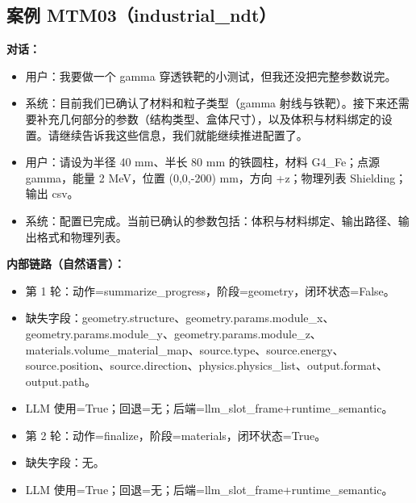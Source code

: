 \documentclass[11pt]{ctexart}
\begin{document}
\subsection{案例 MTM03（industrial\_ndt）}
\textbf{对话：}
\begin{itemize}
\item 用户：我要做一个 gamma 穿透铁靶的小测试，但我还没把完整参数说完。
\item 系统：目前我们已确认了材料和粒子类型（gamma 射线与铁靶）。接下来还需要补充几何部分的参数（结构类型、盒体尺寸），以及体积与材料绑定的设置。请继续告诉我这些信息，我们就能继续推进配置了。
\item 用户：请设为半径 40 mm、半长 80 mm 的铁圆柱，材料 G4\_Fe；点源 gamma，能量 2 MeV，位置 (0,0,-200) mm，方向 +z；物理列表 Shielding；输出 csv。
\item 系统：配置已完成。当前已确认的参数包括：体积与材料绑定、输出路径、输出格式和物理列表。
\end{itemize}
\textbf{内部链路（自然语言）：}
\begin{itemize}
\item 第 1 轮：动作=summarize\_progress，阶段=geometry，闭环状态=False。
\item 缺失字段：geometry.structure、geometry.params.module\_x、geometry.params.module\_y、geometry.params.module\_z、materials.volume\_material\_map、source.type、source.energy、source.position、source.direction、physics.physics\_list、output.format、output.path。
\item LLM 使用=True；回退=无；后端=llm\_slot\_frame+runtime\_semantic。
\item 第 2 轮：动作=finalize，阶段=materials，闭环状态=True。
\item 缺失字段：无。
\item LLM 使用=True；回退=无；后端=llm\_slot\_frame+runtime\_semantic。
\end{itemize}
\end{document}
